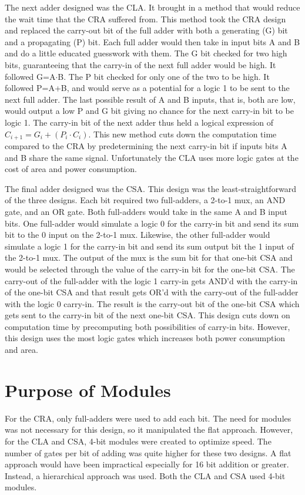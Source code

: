 \documentclass[journal, twocolumn, final,11pt,letterpaper]{IEEEtran}
\begin{document}
The next adder designed was the CLA.  It brought in a method that would reduce the wait time that the CRA suffered from.  This method took the CRA design and replaced the carry-out bit of the full adder with both a generating (G) bit and a propagating (P) bit.  Each full adder would then take in input bits A and B and do a little educated guesswork with them.  The G bit checked for two high bits, guaranteeing that the carry-in of the next full adder would be high.  It followed G=A$\cdot$B.  The P bit checked for only one of the two to be high.  It followed P=A+B, and would serve as a potential for a logic 1 to be sent to the next full adder.  The last possible result of A and B inputs, that is, both are low, would output a low P and G bit giving no chance for the next carry-in bit to be logic 1.  The carry-in bit of the next adder thus held a logical expression of $C_{i+1}=G_i+(P_i\cdot C_i)$.  This new method cuts down the computation time compared to the CRA by predetermining the next carry-in bit if inputs bits A and B share the same signal.  Unfortunately the CLA uses more logic gates at the cost of area and power consumption.  

The final adder designed was the CSA.  This design was the least-straightforward of the three designs.  Each bit required two full-adders, a 2-to-1 mux, an AND gate, and an OR gate.  Both full-adders would take in the same A and B input bits.  One full-adder would simulate a logic 0 for the carry-in bit and send its sum bit to the 0 input on the 2-to-1 mux.  Likewise, the other full-adder would simulate a logic 1 for the carry-in bit and send its sum output bit the 1 input of the 2-to-1 mux.  The output of the mux is the sum bit for that one-bit CSA and would be selected through the value of the carry-in bit for the one-bit CSA. The carry-out of the full-adder with the logic 1 carry-in gets AND'd with the carry-in of the one-bit CSA and that result gets OR'd with the carry-out of the full-adder with the logic 0 carry-in.  The result is the carry-out bit of the one-bit CSA which gets sent to the carry-in bit of the next one-bit CSA.  This design cuts down on computation time by precomputing both possibilities of carry-in bits.  However, this design uses the most logic gates which increases both power consumption and area.  


\section{Purpose of Modules}
For the CRA, only full-adders were used to add each bit.  The need for modules was not necessary for this design, so it manipulated the flat approach.  However, for the CLA and CSA, 4-bit modules were created to optimize speed.  The number of gates per bit of adding was quite higher for these two designs.  A flat approach would have been impractical especially for 16 bit addition or greater.  Instead, a hierarchical approach was used.  Both the CLA and CSA used 4-bit modules.  
\end{document}
